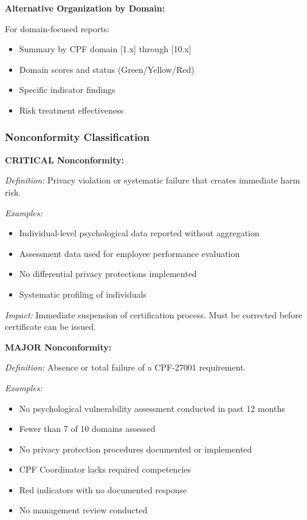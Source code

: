 \documentclass[11pt,a4paper]{article}
\begin{document}
\textbf{Alternative Organization by Domain:}

For domain-focused reports:
\begin{itemize}
\item Summary by CPF domain [1.x] through [10.x]
\item Domain scores and status (Green/Yellow/Red)
\item Specific indicator findings
\item Risk treatment effectiveness
\end{itemize}

\subsubsection{Nonconformity Classification}

\textbf{CRITICAL Nonconformity:}

\textit{Definition:} Privacy violation or systematic failure that creates immediate harm risk.

\textit{Examples:}
\begin{itemize}
\item Individual-level psychological data reported without aggregation
\item Assessment data used for employee performance evaluation
\item No differential privacy protections implemented
\item Systematic profiling of individuals
\end{itemize}

\textit{Impact:} Immediate suspension of certification process. Must be corrected before certificate can be issued.

\textbf{MAJOR Nonconformity:}

\textit{Definition:} Absence or total failure of a CPF-27001 requirement.

\textit{Examples:}
\begin{itemize}
\item No psychological vulnerability assessment conducted in past 12 months
\item Fewer than 7 of 10 domains assessed
\item No privacy protection procedures documented or implemented
\item CPF Coordinator lacks required competencies
\item Red indicators with no documented response
\item No management review conducted
\end{itemize}
\end{document}

